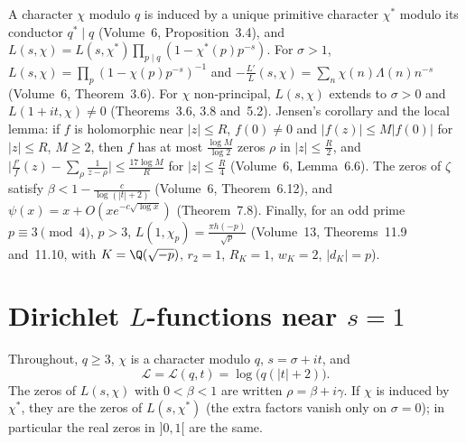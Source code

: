 \begin{reminder}
A character $\chi$ modulo $q$ is induced by a unique primitive character $\chi^*$ modulo its conductor $q^*\mid q$ (Volume~6, Proposition~3.4), and $L(s,\chi)=L(s,\chi^*)\prod_{p\mid q}(1-\chi^*(p)p^{-s})$. For $\sigma>1$, $L(s,\chi)=\prod_p(1-\chi(p)p^{-s})^{-1}$ and
$-\frac{L'}L(s,\chi)=\sum_n\chi(n)\Lambda(n)n^{-s}$ (Volume~6, Theorem~3.6). For $\chi$ non-principal, $L(s,\chi)$ extends to $\sigma>0$ and $L(1+it,\chi)\ne0$ (Theorems~3.6, 3.8 and~5.2). Jensen's corollary and the local lemma: if $f$ is holomorphic near $|z|\le R$, $f(0)\ne0$ and $|f(z)|\le M|f(0)|$ for $|z|\le R$, $M\ge2$, then $f$ has at most
$\frac{\log M}{\log2}$ zeros $\rho$ in $|z|\le\frac R2$, and $\bigl|\frac{f'}f(z)-\sum_\rho\frac1{z-\rho}\bigr|\le\frac{17\log M}R$ for $|z|\le\frac R4$ (Volume~6, Lemma~6.6). The zeros of $\zeta$ satisfy $\beta<1-\frac c{\log(|t|+2)}$ (Volume~6, Theorem~6.12), and $\psi(x)=x+O(xe^{-c\sqrt{\log x}})$ (Theorem~7.8). Finally, for an odd prime $p\equiv3\pmod4$, $p>3$,
$L(1,\chi_p)=\frac{\pi h(-p)}{\sqrt p}$ (Volume~13, Theorems~11.9 and~11.10, with $K=\Q(\sqrt{-p})$, $r_2=1$, $R_K=1$, $w_K=2$, $|d_K|=p$).
\end{reminder}

\section{Dirichlet \texorpdfstring{$L$}{L}-functions near \texorpdfstring{$s=1$}{s=1}}

Throughout, $q\ge3$, $\chi$ is a character modulo $q$, $s=\sigma+it$, and
\[
\mathcal L=\mathcal L(q,t)=\log\bigl(q(|t|+2)\bigr).
\]
The zeros of $L(s,\chi)$ with $0<\beta<1$ are written $\rho=\beta+i\gamma$. If $\chi$ is induced by $\chi^*$, they are the zeros of $L(s,\chi^*)$ (the extra factors vanish only on $\sigma=0$); in particular the real zeros in $]0,1[$ are the same.

